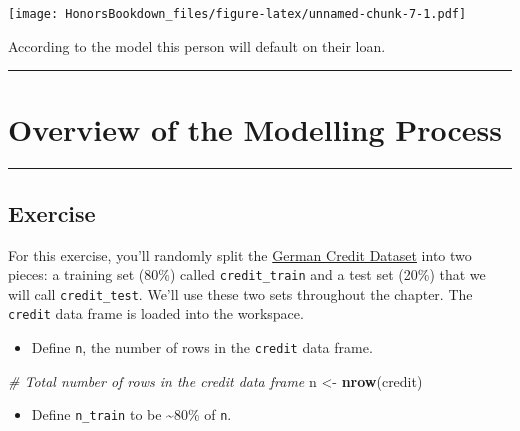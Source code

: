 \documentclass[
]{book}
\newenvironment{Shaded}{\begin{snugshade}}{\end{snugshade}}
\newcommand{\CommentTok}[1]{\textcolor[rgb]{0.56,0.35,0.01}{\textit{#1}}}
\newcommand{\DecValTok}[1]{\textcolor[rgb]{0.00,0.00,0.81}{#1}}
\newcommand{\KeywordTok}[1]{\textcolor[rgb]{0.13,0.29,0.53}{\textbf{#1}}}
\newcommand{\NormalTok}[1]{#1}
\newcommand{\OperatorTok}[1]{\textcolor[rgb]{0.81,0.36,0.00}{\textbf{#1}}}
\newcommand{\StringTok}[1]{\textcolor[rgb]{0.31,0.60,0.02}{#1}}
\providecommand{\tightlist}{%
  \setlength{\itemsep}{0pt}\setlength{\parskip}{0pt}}
\begin{document}
\texttt{[image: HonorsBookdown\_files/figure-latex/unnamed-chunk-7-1.pdf]}

According to the model this person will default on their loan.

\begin{center}\rule{0.5\linewidth}{0.5pt}\end{center}

\hypertarget{overview-of-the-modelling-process}{%
\section{Overview of the Modelling Process}\label{overview-of-the-modelling-process}}

\begin{center}\rule{0.5\linewidth}{0.5pt}\end{center}

\hypertarget{exercise-1}{%
\subsection*{Exercise}\label{exercise-1}}

For this exercise, you'll randomly split the \href{}{German Credit Dataset} into two pieces: a training set (80\%) called \texttt{credit\_train} and a test set (20\%) that we will call \texttt{credit\_test}. We'll use these two sets throughout the chapter. The \texttt{credit} data frame is loaded into the workspace.

\begin{itemize}
\tightlist
\item
  Define \texttt{n}, the number of rows in the \texttt{credit} data frame.
\end{itemize}

\begin{Shaded}
\begin{Highlighting}[]
\CommentTok{# Total number of rows in the credit data frame}
\NormalTok{n <-}\StringTok{ }\KeywordTok{nrow}\NormalTok{(credit)}
\end{Highlighting}
\end{Shaded}

\begin{itemize}
\tightlist
\item
  Define \texttt{n\_train} to be \textasciitilde80\% of \texttt{n}.
\end{itemize}

\begin{Shaded}
\end{Shaded}
\end{document}

